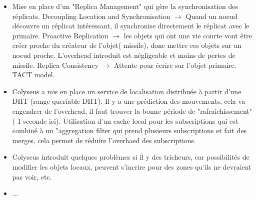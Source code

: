 \documentclass[11pt,a4paper]{article}
\begin{document}
\begin{itemize}
	\item Mise en place d'un "Replica Management" qui gère la synchronisation des réplicats. Decoupling Location and Synchronisation $\rightarrow$ Quand un noeud découvre un réplicat intéressant, il synchronise directement le réplicat avec le primaire.
	Proactive Replication $\rightarrow$ les objets qui ont une vie courte vont être créer proche du créateur de l'objet( missile), donc mettre ces objets sur un noeud proche. L'overhead introduit est négligeable et moins de pertes de missile.
	Replica Consistency $\rightarrow$ Attente pour écrire sur l'objet primaire. TACT model. 
	\item Colyseus a mis en place un service de localisation distribuée à partir d'une DHT (range-queriable DHT). Il y a une prédiction des mouvements, cela va engendrer de l'overhead, il faut trouver la bonne période de "rafraichissement" ( 1 seconde ici). Utilisation d'un cache local pour les subscriptions qui est combiné à un "aggregation filter qui prend plusieurs subscriptions et fait des merges, cela permet de réduire l'overhaed des subscriptions. 
	\item Colyseus introduit quelques problèmes si il y des tricheurs, car possibilités de modifier les objets locaux, peuvent s'incrire pour des zones qu'ils ne devraient pas voir, etc. 
	\item ...
  \end{itemize}
\end{document}
